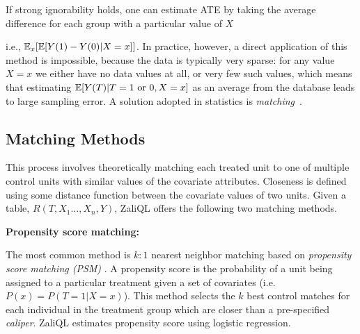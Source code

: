 If strong ignorability holds, one can estimate ATE by
 taking the  average difference for each group with a particular value of $X$  i.e., $\mathbb{E}_x[\mathbb{E}[Y(1)-Y(0)| X=x]]$.
In practice, however, a direct application of this method is
impossible, because the data is typically very sparse: for any value
$X=x$ we either have no data values at all, or very few such values,
which means that estimating $\mathbb{E}[Y(T)|T=1\mbox{ or }0,X=x]$ as an
average from the database leads to large sampling error. A solution adopted in
statistics is {\em matching}~\cite{Rubin1983b}.


\subsection{Matching Methods}
\label{sec:algo}
This process involves theoretically matching each treated unit to one of multiple control units with similar values of the covariate attributes. Closeness is defined using some distance function between the covariate values of two units. Given a table, $R(T,X_1 \ldots,X_n,Y)$, ZaliQL offers the following two matching methods.


{\bf Propensity score matching:}
\label{sec:nnm}
The most common method is $k:1$ nearest neighbor matching based on {\em propensity score matching (PSM)} \cite{Rubin1983b}. A propensity score is the probability of a unit being assigned to a particular treatment given a set of covariates (i.e. $P(x)=P(T=1|X=x)$). This method selects the $k$ best control matches for each individual in the treatment group which are closer than a pre-specified {
\em caliper}. ZaliQL estimates propensity score using logistic regression. 


